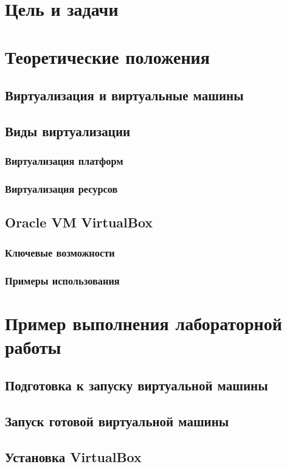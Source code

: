 \chapter{Цель и задачи}

\chapter{Теоретические положения}
\section{Виртуализация и виртуальные машины}
\section{Виды виртуализации}
\subsection{Виртуализация платформ}
\subsection{Виртуализация ресурсов}
\section{Oracle VM VirtualBox}
\subsection{Ключевые возможности}
\subsection{Примеры использования}

\chapter{Пример выполнения лабораторной работы}
\section{Подготовка к запуску виртуальной машины}
\section{Запуск готовой виртуальной машины}
\section{Установка VirtualBox}
